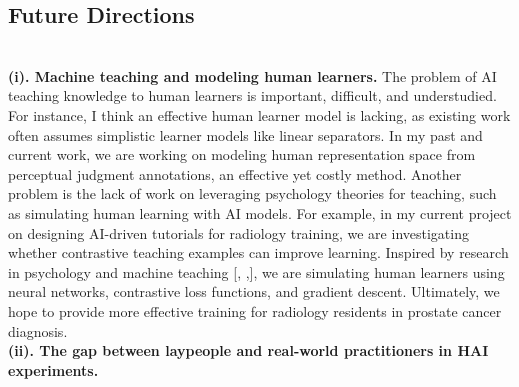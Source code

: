 \subsection*{Future Directions}



\noindent \textbf{\\(i). Machine teaching and modeling human learners.} 
The problem of AI teaching knowledge to human learners is important, difficult, and understudied. For instance, I think an effective human learner model is lacking, as existing work often assumes simplistic learner models like linear separators. In my past and current work, we are working on modeling human representation space from perceptual judgment annotations, an effective yet costly method. Another problem is the lack of work on leveraging psychology theories for teaching, such as simulating human learning with AI models. For example, in my current project on designing AI-driven tutorials for radiology training, we are investigating whether contrastive teaching examples can improve learning. Inspired by research in psychology and machine teaching [, ,], we are simulating human learners using neural networks, contrastive loss functions, and gradient descent. Ultimately, we hope to provide more effective training for radiology residents in prostate cancer diagnosis.
\noindent \textbf{\\(ii). The gap between laypeople and real-world practitioners in HAI experiments.}
